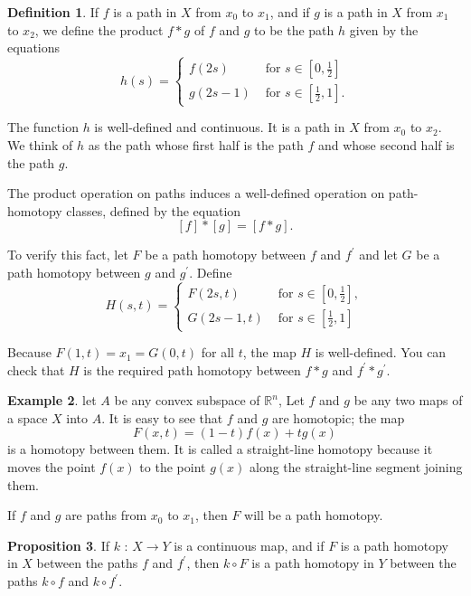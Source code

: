\documentclass[12pt,a4paper]{book}
\theoremstyle{definition}
\newtheorem{defn}{Definition}[section]
\newtheorem{prop}[defn]{Proposition}
\newtheorem{exam}[defn]{Example}
\begin{document}
\begin{defn}
    If $f$ is a path in $X$ from $x_0$ to $x_1$, and if $g$ is a path in $X$ from $x_1$ to $x_2$, we define the product $f * g$ of $f$ and $g$ to be the path $h$ given by the equations
    $$
        h(s)= \begin{cases}f(2 s) & \text { for } s \in\left[0, \frac{1}{2}\right] \\ g(2 s-1) & \text { for } s \in\left[\frac{1}{2}, 1\right] .\end{cases}
    $$

    The function $h$ is well-defined and continuous. It is a path in $X$ from $x_0$ to $x_2$. We think of $h$ as the path whose first half is the path $f$ and whose second half is the path $g$.

    The product operation on paths induces a well-defined operation on path-homotopy classes, defined by the equation
    $$
        [f] *[g]=[f * g] .
    $$

    To verify this fact, let $F$ be a path homotopy between $f$ and $f^{\prime}$ and let $G$ be a path homotopy between $g$ and $g^{\prime}$. Define
    $$
        H(s, t)= \begin{cases}F(2 s, t) & \text { for } s \in\left[0, \frac{1}{2}\right], \\ G(2 s-1, t) & \text { for } s \in\left[\frac{1}{2}, 1\right]\end{cases}
    $$

    Because $F(1, t)=x_1=G(0, t)$ for all $t$, the map $H$ is well-defined. You can check that $H$ is the required path homotopy between $f * g$ and $f^{\prime} * g^{\prime}$.
\end{defn}
\begin{exam}
    let $A$ be any convex subspace of $\mathbb{R}^n$, Let $f$ and $g$ be any two maps of a space $X$ into $A$. It is easy to see that $f$ and $g$ are homotopic; the map
    $$
        F(x, t)=(1-t)f(x)+tg(x)
    $$
    is a homotopy between them. It is called a straight-line homotopy because it moves the point $f(x)$ to the point $g(x)$ along the straight-line segment joining them.

    If $f$ and $g$ are paths from $x_0$ to $x_1$, then $F$ will be a path homotopy.
\end{exam}
\begin{prop}
    If $k$ : $X \rightarrow Y$ is a continuous map,
    and if $F$ is a path homotopy in $X$ between the paths $f$ and $f^{\prime}$, then $k \circ F$ is a path homotopy in $Y$ between the paths $k \circ f$ and $k \circ f^{\prime}$.
    \label{proposition:composite,path homotopy}
\end{prop}
\end{document}
